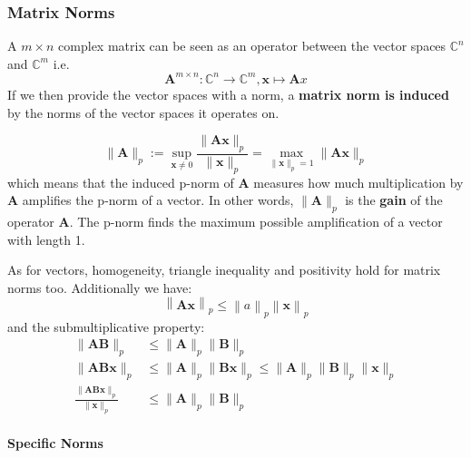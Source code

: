 \subsubsection{Matrix Norms}
A $m\times n$ complex matrix can be seen as an operator between the vector spaces $\mathbb{C}^n$ and $\mathbb{C}^m$ i.e.
\begin{equation*}
    \mathbf{A}^{m\times n}:\mathbb{C}^n\to\mathbb{C}^m,\mathbf{x}\mapsto \mathbf{A}x
\end{equation*}
If we then provide the vector spaces with a norm, a \textbf{matrix norm is induced} by the norms of the vector spaces it operates on.

\begin{equation*}
    \|\mathbf{A}\|_p:=\sup_{\mathbf{x}\neq0}\frac{\|\mathbf{Ax}\|_p}{\|\mathbf{x}\|_p}=\max_{\|\mathbf{x}\|_p=1}\|\mathbf{Ax}\|_p
\end{equation*}
which means that the induced p-norm of $\mathbf{A}$ measures how much multiplication by $\mathbf{A}$ amplifies the p-norm of a vector. In other words, $\|\mathbf{A}\|_p$ is the \textbf{gain} of the operator $\mathbf{A}$. The p-norm finds the maximum possible amplification of a vector with length 1.

\newpar{}

As for vectors, homogeneity, triangle inequality and positivity hold for matrix norms too. Additionally we have:
\begin{equation*}
    \left\|\mathbf{Ax}\right\|_p\leq\left\|a\right\|_p\left\|\mathbf{x}\right\|_p
\end{equation*}
and the submultiplicative property:
\begin{align*}
    \|\mathbf{AB}\|_p                                     & \leq\|\mathbf{A}\|_p\|\mathbf{B}\|_p                                                      \\
    \|\mathbf{AB} \mathbf{x}\|_p                          & \leq\|\mathbf{A}\|_p\|\mathbf{Bx}\|_p\leq\|\mathbf{A}\|_p\|\mathbf{B}\|_p\|\mathbf{x}\|_p \\
    \frac{\|\mathbf{AB} \mathbf{x}\|_p}{\|\mathbf{x}\|_p} & \leq\|\mathbf{A}\|_p\|\mathbf{B}\|_p
\end{align*}


\paragraph{Specific Norms}


